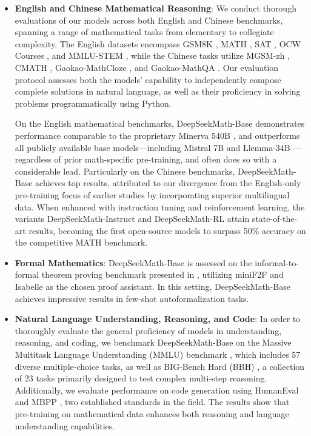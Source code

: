 \begin{itemize}[topsep=0pt]
    \item \textbf{English and Chinese Mathematical Reasoning}: We conduct thorough evaluations of our models across both English and Chinese benchmarks, spanning a range of mathematical tasks from elementary to collegiate complexity. The English datasets encompass GSM8K \citep{gsm8k}, MATH \citep{MATH}, SAT \citep{llemma}, OCW Courses \citep{minerva}, and MMLU-STEM \citep{mmlu}, while the Chinese tasks utilize MGSM-zh \citep{mgsm}, CMATH \citep{wei2023cmath}, Gaokao-MathCloze \citep{agieval}, and Gaokao-MathQA \citep{agieval}. Our evaluation protocol assesses both the models' capability to independently compose complete solutions in natural language, as well as their proficiency in solving problems programmatically using Python.

    On the English mathematical benchmarks, DeepSeekMath-Base demonstrates performance comparable to the proprietary Minerva 540B \citep{minerva}, and outperforms all publicly available base models—including Mistral 7B \citep{mistral} and Llemma-34B \citep{llemma}—regardless of prior math-specific pre-training, and often does so with a considerable lead. Particularly on the Chinese benchmarks, DeepSeekMath-Base achieves top results, attributed to our divergence from the English-only pre-training focus of earlier studies \citep{minerva,llemma} by incorporating superior multilingual data. When enhanced with instruction tuning and reinforcement learning, the variants DeepSeekMath-Instruct and DeepSeekMath-RL attain state-of-the-art results, becoming the first open-source models to surpass 50\% accuracy on the competitive MATH benchmark.

\item \textbf{Formal Mathematics}: DeepSeekMath-Base is assessed on the informal-to-formal theorem proving benchmark presented in \citep{dsp_proof}, utilizing miniF2F \citep{minif2f} and Isabelle \citep{isabelle} as the chosen proof assistant. In this setting, DeepSeekMath-Base achieves impressive results in few-shot autoformalization tasks.

\item \textbf{Natural Language Understanding, Reasoning, and Code}: In order to thoroughly evaluate the general proficiency of models in understanding, reasoning, and coding, we benchmark DeepSeekMath-Base on the Massive Multitask Language Understanding (MMLU) benchmark \citep{mmlu}, which includes 57 diverse multiple-choice tasks, as well as BIG-Bench Hard (BBH) \citep{bbh}, a collection of 23 tasks primarily designed to test complex multi-step reasoning. Additionally, we evaluate performance on code generation using HumanEval \citep{codex} and MBPP \citep{mbpp}, two established standards in the field. The results show that pre-training on mathematical data enhances both reasoning and language understanding capabilities.


\end{itemize}
